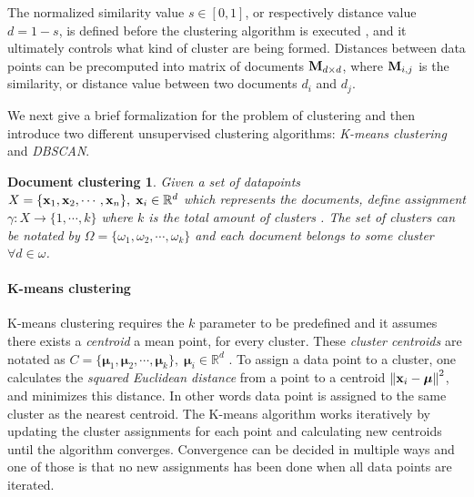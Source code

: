 
The normalized similarity value $s \in [0, 1]$, or respectively distance value $d = 1 - s$, is defined before the clustering algorithm is executed \cite{hastie_09_elements-of.statistical-learning}, and it ultimately controls what kind of cluster are being formed. Distances between data points can be precomputed into matrix of documents $\mathbf{M}_{d \times d}$, where $\mathbf{M}_{i, j}$ is the similarity, or distance value between two documents $d_i$ and $d_j$. 

We next give a brief formalization for the problem of clustering and then introduce two different unsupervised clustering algorithms: \emph{K-means clustering} and \emph{DBSCAN}.

\newtheorem*{docclus}{Document clustering}
\begin{docclus}
Given a set of datapoints $X = \{\mathbf{x}_1, \mathbf{x}_2, \cdots, \mathbf{x}_n\},  \; \mathbf{x}_i \in \mathbb{R}^d$ which represents the documents, define assignment $\gamma: X \rightarrow \{1, \cdots, k\}$ where $k$ is the total amount of clusters \cite{Manning:2008:IIR:1394399}. The set of clusters can be notated by $\Omega = \{\omega_1, \omega_2, \cdots, \omega_k\}$ and each document belongs to some cluster $\forall d \in \omega$. 
\end{docclus}


\paragraph{K-means clustering}

K-means clustering requires the $k$ parameter to be predefined and it assumes there exists a \emph{centroid} \ie a mean point, for every cluster. These \emph{cluster centroids} are notated as $C = \{\boldsymbol{\mu}_1, \boldsymbol{\mu}_2, \cdots, \boldsymbol{\mu}_k\}, \; \boldsymbol{\mu}_i \in \mathbb{R}^d$ \cite{Manning:2008:IIR:1394399}. To assign a data point to a cluster, one calculates the \emph{squared Euclidean distance} from a point to a centroid $\left\lVert\mathbf{x}_i - \boldsymbol{\mu}\right\rVert^2$, and minimizes this distance. In other words data point is assigned to the same cluster as the nearest centroid. The K-means algorithm works iteratively by updating the cluster assignments for each point and calculating new centroids until the algorithm converges. Convergence can be decided in multiple ways and one of those is that no new assignments has been done when all data points are iterated. 


